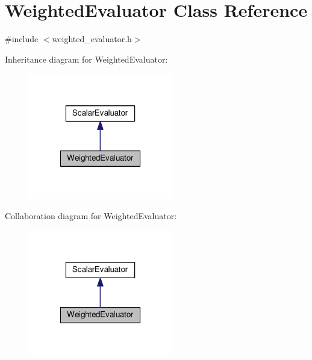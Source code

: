 \hypertarget{classWeightedEvaluator}{\section{Weighted\-Evaluator Class Reference}
\label{classWeightedEvaluator}
}


{\ttfamily \#include $<$weighted\-\_\-evaluator.\-h$>$}



Inheritance diagram for Weighted\-Evaluator\-:
\nopagebreak
\begin{figure}[H]
\begin{center}
\leavevmode
\includegraphics[width=178pt]{classWeightedEvaluator__inherit__graph}
\end{center}
\end{figure}


Collaboration diagram for Weighted\-Evaluator\-:
\nopagebreak
\begin{figure}[H]
\begin{center}
\leavevmode
\includegraphics[width=178pt]{classWeightedEvaluator__coll__graph}
\end{center}
\end{figure}
